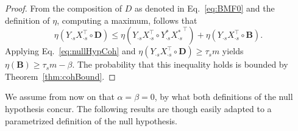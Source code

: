 \begin{proof} 
From the composition of $D$ as denoted in Eq.~\eqref{eq:BMF0} and the definition of $\eta$, computing a maximum, follows that 
\[\eta\left(Y_{\cdot s}X_{\cdot s}^\top \circ \mathbf{D}\right)\leq \eta\left(Y_{\cdot s}X_{\cdot s}^\top \circ Y^*_{\cdot s}{X^*_{\cdot s}}^\top\right)+\eta\left(Y_{\cdot s}X_{\cdot s}^\top \circ \mathbf{B}\right).\]
Applying Eq.~\eqref{eq:nullHypCoh} and $\eta\left(Y_{\cdot s}X_{\cdot s}^\top \circ \mathbf{D}\right)\geq \tau_s m$ yields
$\eta(\mathbf{B})\geq \tau_s m-\beta$.
The probability that this inequality holds is bounded by Theorem~\ref{thm:cohBound}.
\end{proof}
We assume from now on that $\alpha=\beta=0$, by what both definitions of the null hypothesis concur. The following results are though easily adapted to a parametrized definition of the null hypothesis.  
